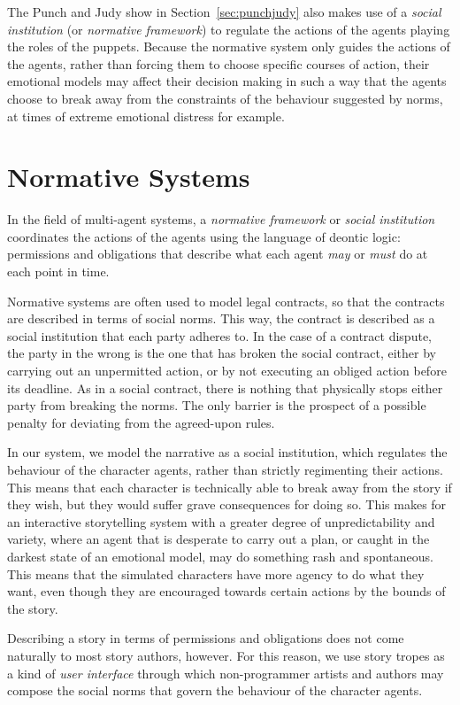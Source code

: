 \documentclass[11pt]{report}
\begin{document}
The Punch and Judy show in Section~\ref{sec:punchjudy} also makes use of a
\emph{social institution} (or \emph{normative framework}) to regulate the
actions of the agents playing the roles of the puppets. Because the normative
system only guides the actions of the agents, rather than forcing them to choose
specific courses of action, their emotional models may affect their decision
making in such a way that the agents choose to break away from the constraints
of the behaviour suggested by norms, at times of extreme emotional distress for
example.

\section{Normative Systems}
\label{sec:normative-intro}
In the field of multi-agent systems, a \emph{normative framework} or
\emph{social institution} coordinates the actions of the agents using the
language of deontic logic: permissions and obligations that describe what each
agent \emph{may} or \emph{must} do at each point in time.

Normative systems are often used to model legal contracts, so that the contracts
are described in terms of social norms. This way, the contract is described as a
social institution that each party adheres to. In the case of a contract
dispute, the party in the wrong is the one that has broken the social contract,
either by carrying out an unpermitted action, or by not executing an obliged
action before its deadline. As in a social contract, there is nothing that
physically stops either party from breaking the norms. The only barrier is the
prospect of a possible penalty for deviating from the agreed-upon rules.

In our system, we model the narrative as a social institution, which regulates
the behaviour of the character agents, rather than strictly regimenting their
actions. This means that each character is technically able to break away from
the story if they wish, but they would suffer grave consequences for doing so.
This makes for an interactive storytelling system with a greater degree of
unpredictability and variety, where an agent that is desperate to carry out a
plan, or caught in the darkest state of an emotional model, may do something
rash and spontaneous. This means that the simulated characters have more agency
to do what they want, even though they are encouraged towards certain actions by
the bounds of the story.

Describing a story in terms of permissions and obligations does not come
naturally to most story authors, however. For this reason, we use story tropes
as a kind of \emph{user interface} through which non-programmer artists and
authors may compose the social norms that govern the behaviour of the character agents.
\end{document}
